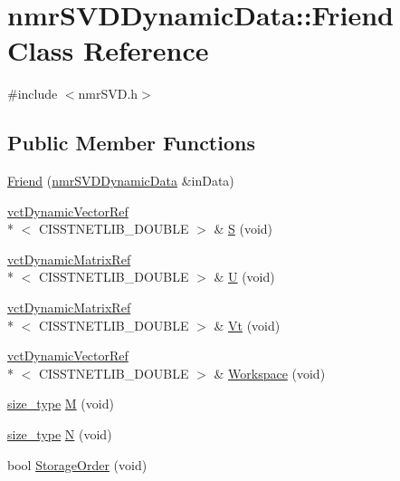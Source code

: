 \hypertarget{classnmr_s_v_d_dynamic_data_1_1_friend}{\section{nmr\-S\-V\-D\-Dynamic\-Data\-:\-:Friend Class Reference}
\label{classnmr_s_v_d_dynamic_data_1_1_friend}
}


{\ttfamily \#include $<$nmr\-S\-V\-D.\-h$>$}

\subsection*{Public Member Functions}
\begin{DoxyCompactItemize}
\item 
\hyperlink{classnmr_s_v_d_dynamic_data_1_1_friend_af1b7405daba9b87fdae4a2f6edc3b1c2}{Friend} (\hyperlink{classnmr_s_v_d_dynamic_data}{nmr\-S\-V\-D\-Dynamic\-Data} \&in\-Data)
\item 
\hyperlink{classvct_dynamic_vector_ref}{vct\-Dynamic\-Vector\-Ref}\\*
$<$ C\-I\-S\-S\-T\-N\-E\-T\-L\-I\-B\-\_\-\-D\-O\-U\-B\-L\-E $>$ \& \hyperlink{classnmr_s_v_d_dynamic_data_1_1_friend_a0fe1a08405dd6bfc2a0ea5fd846fa04e}{S} (void)
\item 
\hyperlink{classvct_dynamic_matrix_ref}{vct\-Dynamic\-Matrix\-Ref}\\*
$<$ C\-I\-S\-S\-T\-N\-E\-T\-L\-I\-B\-\_\-\-D\-O\-U\-B\-L\-E $>$ \& \hyperlink{classnmr_s_v_d_dynamic_data_1_1_friend_a45d6531b7a9a956fa988fbcf8cf31c2a}{U} (void)
\item 
\hyperlink{classvct_dynamic_matrix_ref}{vct\-Dynamic\-Matrix\-Ref}\\*
$<$ C\-I\-S\-S\-T\-N\-E\-T\-L\-I\-B\-\_\-\-D\-O\-U\-B\-L\-E $>$ \& \hyperlink{classnmr_s_v_d_dynamic_data_1_1_friend_a4f42fa9246f934c17b192b72fc7b17aa}{Vt} (void)
\item 
\hyperlink{classvct_dynamic_vector_ref}{vct\-Dynamic\-Vector\-Ref}\\*
$<$ C\-I\-S\-S\-T\-N\-E\-T\-L\-I\-B\-\_\-\-D\-O\-U\-B\-L\-E $>$ \& \hyperlink{classnmr_s_v_d_dynamic_data_1_1_friend_afd614743b4f0fa86d7ced1516b692000}{Workspace} (void)
\item 
\hyperlink{classnmr_s_v_d_dynamic_data_ae1d183124f1fe39da05af9cea168101d}{size\-\_\-type} \hyperlink{classnmr_s_v_d_dynamic_data_1_1_friend_aa5b53529a48a7e34ad292e1815ea06e4}{M} (void)
\item 
\hyperlink{classnmr_s_v_d_dynamic_data_ae1d183124f1fe39da05af9cea168101d}{size\-\_\-type} \hyperlink{classnmr_s_v_d_dynamic_data_1_1_friend_a5e26ec234bd61577d388f52793d1337c}{N} (void)
\item 
bool \hyperlink{classnmr_s_v_d_dynamic_data_1_1_friend_a5d07c0dd95ca7210924545be4a2d7c5d}{Storage\-Order} (void)
\end{DoxyCompactItemize}


